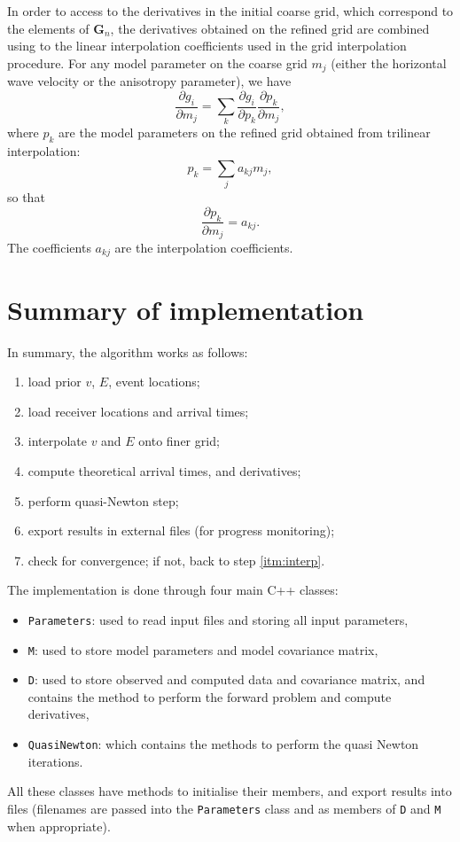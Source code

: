 \documentclass{article}
\newcommand\mat[1]{\mathbf{#1}}
\begin{document}
In order to access to the derivatives in the initial coarse grid, which correspond to the elements of $\mat{G}_n$, the derivatives obtained on the refined grid are combined using to the linear interpolation coefficients used in the grid interpolation procedure. For any model parameter on the coarse grid $m_j$ (either the horizontal wave velocity or the anisotropy parameter), we have
\begin{equation}
  \frac{\partial g_i}{\partial m_j} = \sum_k \frac{\partial g_i}{\partial p_k}\frac{\partial p_k}{\partial m_j},
\end{equation}
where $p_k$ are the model parameters on the refined grid obtained from trilinear interpolation:
\begin{equation}
  p_k = \sum_j a_{kj} m_j,
\end{equation}
so that
\begin{equation}
  \frac{\partial p_k}{\partial m_j} = a_{kj}.
\end{equation}
The coefficients $a_{kj}$ are the interpolation coefficients.

\section{Summary of implementation}

In summary, the algorithm works as follows:
\begin{enumerate}
\item load prior $v$, $E$, event locations;
\item load receiver locations and arrival times;
\item \label{itm:interp} interpolate $v$ and $E$ onto finer grid;
\item compute theoretical arrival times, and derivatives;
\item perform quasi-Newton step;
\item export results in external files (for progress monitoring);
\item check for convergence; if not, back to step \ref{itm:interp}.
\end{enumerate}

The implementation is done through four main C++ classes: 
\begin{itemize}
\item \verb+Parameters+: used to read input files and storing all input parameters, 
\item \verb+M+: used to store model parameters and model covariance matrix,
\item \verb+D+: used to store observed and computed data and covariance matrix, and contains the method to perform the forward problem and compute derivatives,
\item \verb+QuasiNewton+: which contains the methods to perform the quasi Newton iterations.
\end{itemize}
All these classes have methods to initialise their members, and export results into files (filenames are passed into the \verb+Parameters+ class and as members of \verb+D+ and \verb+M+ when appropriate).
\end{document}
